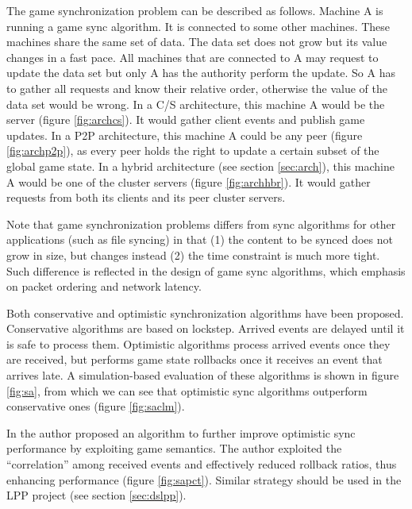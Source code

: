 \documentclass{article}
\begin{document}
The game synchronization problem can be described as follows. Machine A is running a game sync algorithm. It is connected to some other machines. These machines share the same set of data. The data set does not grow but its value changes in a fast pace. All machines that are connected to A may request to update the data set but only A has the authority perform the update. So A has to gather all requests and know their relative order, otherwise the value of the data set would be wrong. In a C/S architecture, this machine A would be the server (figure \ref{fig:archcs}). It would gather client events and publish game updates. In a P2P architecture, this machine A could be any peer (figure \ref{fig:archp2p}), as every peer holds the right to update a certain subset of the global game state. In a hybrid architecture (see section \ref{sec:arch}), this machine A would be one of the cluster servers (figure \ref{fig:archhbr}). It would gather requests from both its clients and its peer cluster servers.

Note that game synchronization problems differs from sync algorithms for other applications (such as file syncing) in that (1) the content to be synced does not grow in size, but changes instead (2) the time constraint is much more tight. Such difference is reflected in the design of game sync algorithms, which emphasis on packet ordering and network latency.

Both conservative and optimistic synchronization algorithms have been proposed. Conservative algorithms are based on lockstep. Arrived events are delayed until it is safe to process them. Optimistic algorithms process arrived events once they are received, but performs game state rollbacks once it receives an event that arrives late. A simulation-based evaluation of these algorithms is shown in figure \ref{fig:sa}, from which we can see that optimistic sync algorithms outperform conservative ones (figure \ref{fig:saclm}). 

In \cite{Ferretti05} the author proposed an algorithm to further improve optimistic sync performance by exploiting game semantics. The author exploited the ``correlation'' among received events and effectively reduced rollback ratios, thus enhancing performance (figure \ref{fig:sapct}). Similar strategy should be used in the LPP project (see section \ref{sec:dslpp}).
\end{document}
